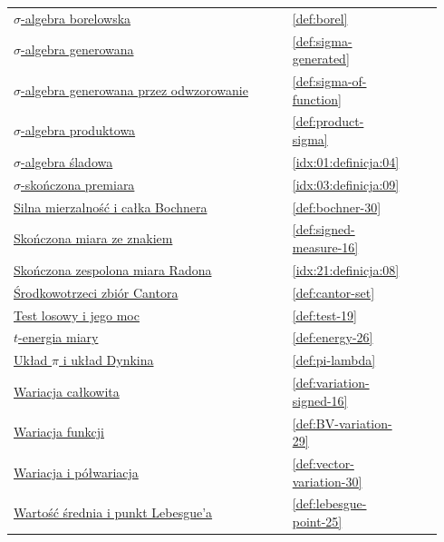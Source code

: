 \documentclass[11pt,a4paper,oneside]{book}
\numberwithin{equation}{chapter}
\theoremstyle{plain}
\theoremstyle{definition}
\theoremstyle{remark}
\begin{document}
\begin{longtable}{@{}p{0.72\linewidth}p{0.135\linewidth}p{0.08\linewidth}@{}}
\hyperref[def:borel]{$\sigma$-algebra borelowska} & \ref*{def:borel} & \pageref*{def:borel} \\
\hyperref[def:sigma-generated]{$\sigma$-algebra generowana} & \ref*{def:sigma-generated} & \pageref*{def:sigma-generated} \\
\hyperref[def:sigma-of-function]{$\sigma$-algebra generowana przez odwzorowanie} & \ref*{def:sigma-of-function} & \pageref*{def:sigma-of-function} \\
\hyperref[def:product-sigma]{$\sigma$-algebra produktowa} & \ref*{def:product-sigma} & \pageref*{def:product-sigma} \\
\hyperref[idx:01:definicja:04]{$\sigma$-algebra śladowa} & \ref*{idx:01:definicja:04} & \pageref*{idx:01:definicja:04} \\
\hyperref[idx:03:definicja:09]{\texorpdfstring{$\sigma$}{sigma}-skończona premiara} & \ref*{idx:03:definicja:09} & \pageref*{idx:03:definicja:09} \\
\hyperref[def:bochner-30]{Silna mierzalność i całka Bochnera} & \ref*{def:bochner-30} & \pageref*{def:bochner-30} \\
\hyperref[def:signed-measure-16]{Skończona miara ze znakiem} & \ref*{def:signed-measure-16} & \pageref*{def:signed-measure-16} \\
\hyperref[idx:21:definicja:08]{Skończona zespolona miara Radona} & \ref*{idx:21:definicja:08} & \pageref*{idx:21:definicja:08} \\
\hyperref[def:cantor-set]{Środkowotrzeci zbiór Cantora} & \ref*{def:cantor-set} & \pageref*{def:cantor-set} \\
\hyperref[def:test-19]{Test losowy i jego moc} & \ref*{def:test-19} & \pageref*{def:test-19} \\
\hyperref[def:energy-26]{$t$-energia miary} & \ref*{def:energy-26} & \pageref*{def:energy-26} \\
\hyperref[def:pi-lambda]{Układ $\pi$ i układ Dynkina} & \ref*{def:pi-lambda} & \pageref*{def:pi-lambda} \\
\hyperref[def:variation-signed-16]{Wariacja całkowita} & \ref*{def:variation-signed-16} & \pageref*{def:variation-signed-16} \\
\hyperref[def:BV-variation-29]{Wariacja funkcji} & \ref*{def:BV-variation-29} & \pageref*{def:BV-variation-29} \\
\hyperref[def:vector-variation-30]{Wariacja i półwariacja} & \ref*{def:vector-variation-30} & \pageref*{def:vector-variation-30} \\
\hyperref[def:lebesgue-point-25]{Wartość średnia i punkt Lebesgue'a} & \ref*{def:lebesgue-point-25} & \pageref*{def:lebesgue-point-25} \\

\end{longtable}
\end{document}
